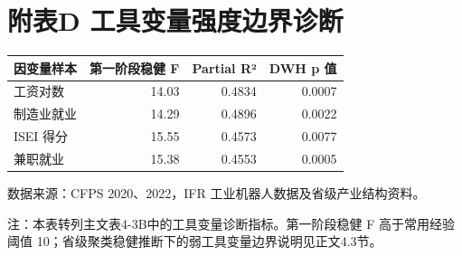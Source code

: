 \documentclass[UTF8, zihao=-4, a4paper, openany, fontset=none]{ctexrep}
\newcounter{none}
\numberwithin{equation}{chapter}
\begin{document}
\section{附表D 工具变量强度边界诊断}\label{ux9644ux8868d-ux5de5ux5177ux53d8ux91cfux5f3aux5ea6ux8fb9ux754cux8bcaux65ad}

{\def\LTcaptype{none} %
\begin{longtable}[]{@{}lrrr@{}}
\toprule\noalign{}
因变量样本 & 第一阶段稳健 F & Partial R² & DWH p 值 \\
\midrule\noalign{}
\endhead
\bottomrule\noalign{}
\endlastfoot
工资对数 & 14.03 & 0.4834 & 0.0007 \\
制造业就业 & 14.29 & 0.4896 & 0.0022 \\
ISEI 得分 & 15.55 & 0.4573 & 0.0077 \\
兼职就业 & 15.38 & 0.4553 & 0.0005 \\
\end{longtable}
}

数据来源：CFPS 2020、2022，IFR 工业机器人数据及省级产业结构资料。

注：本表转列主文表4-3B中的工具变量诊断指标。第一阶段稳健 F 高于常用经验阈值 10；省级聚类稳健推断下的弱工具变量边界说明见正文4.3节。
\end{document}

